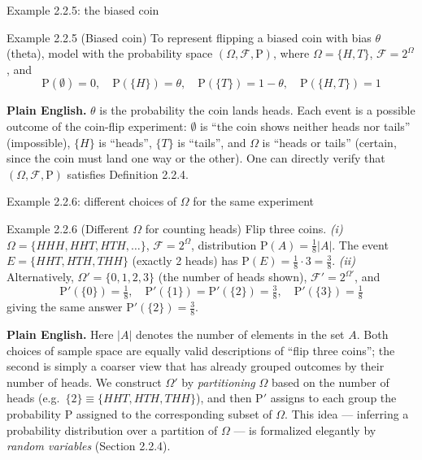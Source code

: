 \documentclass[aspectratio=169,10pt]{beamer}
\begin{document}
\begin{frame}{Example 2.2.5: the biased coin}
\begin{block}{Example 2.2.5 (Biased coin)}
To represent flipping a biased coin with bias $\theta$ (theta), model with the
probability space $(\Omega,\mathcal{F},\mathrm{P})$, where
$\Omega=\{H,T\}$, $\mathcal{F}=2^{\Omega}$, and
\[ \mathrm{P}(\emptyset)=0, \quad \mathrm{P}(\{H\})=\theta, \quad \mathrm{P}(\{T\})=1-\theta, \quad \mathrm{P}(\{H,T\})=1 \]
\end{block}
\textbf{Plain English.} $\theta$ is the probability the coin lands heads. Each
event is a possible outcome of the coin-flip experiment: $\emptyset$ is ``the
coin shows neither heads nor tails'' (impossible), $\{H\}$ is ``heads'',
$\{T\}$ is ``tails'', and $\Omega$ is ``heads or tails'' (certain, since the
coin must land one way or the other). One can directly verify that
$(\Omega,\mathcal{F},\mathrm{P})$ satisfies Definition 2.2.4.
\end{frame}

\begin{frame}{Example 2.2.6: different choices of $\Omega$ for the same experiment}
\begin{block}{Example 2.2.6 (Different $\Omega$ for counting heads)}
Flip three coins. \emph{(i)} $\Omega=\{HHH,HHT,HTH,\ldots\}$, $\mathcal{F}=2^{\Omega}$,
distribution $\mathrm{P}(A)=\tfrac18|A|$. The event $E=\{HHT,HTH,THH\}$ (exactly 2
heads) has $\mathrm{P}(E)=\tfrac18\cdot3=\tfrac38$.
\emph{(ii)} Alternatively, $\Omega'=\{0,1,2,3\}$ (the number of heads shown),
$\mathcal{F}'=2^{\Omega'}$, and
\[ \mathrm{P}'(\{0\})=\tfrac18,\quad \mathrm{P}'(\{1\})=\mathrm{P}'(\{2\})=\tfrac38,\quad \mathrm{P}'(\{3\})=\tfrac18 \]
giving the same answer $\mathrm{P}'(\{2\})=\tfrac38$.
\end{block}
\textbf{Plain English.} Here $|A|$ denotes the number of elements in the set
$A$. Both choices of sample space are equally valid descriptions of ``flip
three coins''; the second is simply a coarser view that has already grouped
outcomes by their number of heads. We construct $\Omega'$ by
\emph{partitioning} $\Omega$ based on the number of heads (e.g.\
$\{2\}\equiv\{HHT,HTH,THH\}$), and then $\mathrm{P}'$ assigns to each group
the probability $\mathrm{P}$ assigned to the corresponding subset of
$\Omega$. This idea --- inferring a probability distribution over a
partition of $\Omega$ --- is formalized elegantly by \emph{random variables}
(Section 2.2.4).
\end{frame}
\end{document}
